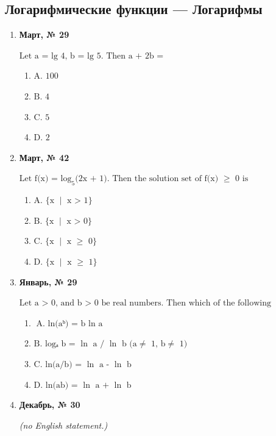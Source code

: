 \subsection*{Логарифмические функции — Логарифмы}
\begin{enumerate}
\item \textbf{Март, № 29} \par \smallskip
$\displaystyle \text{Let a = lg 4, b = lg 5. Then a + 2b =}$
\begin{enumerate}
\item $\displaystyle \text{A. 100}$
\item $\displaystyle \text{B. 4}$
\item $\displaystyle \text{C. 5}$
\item $\displaystyle \text{D. 2}$
\end{enumerate}
\item \textbf{Март, № 42} \par \smallskip
$\displaystyle \text{Let f(x) = log}_{5}\text{(2x + 1). Then the solution set of f(x) }\geq\text{  0 is}$
\begin{enumerate}
\item $\displaystyle \text{A. }\{\text{x }\mid\text{ x > 1}\}$
\item $\displaystyle \text{B. }\{\text{x }\mid\text{ x > 0}\}$
\item $\displaystyle \text{C. }\{\text{x }\mid\text{ x }\geq\text{  0}\}$
\item $\displaystyle \text{D. }\{\text{x }\mid\text{ x }\geq\text{  1}\}$
\end{enumerate}
\item \textbf{Январь, № 29} \par \smallskip
$\displaystyle \text{Let a > 0, and b > 0 be real numbers. Then which of the following statements is incorrect? ( )}$
\begin{enumerate}
\item $\displaystyle \text{A. ln(aᵇ) = b }\ln\text{ a}$
\item $\displaystyle \text{B. logₐ b = }\ln\text{ a / }\ln\text{ b (a}\neq\text{ 1, b}\neq\text{ 1)}$
\item $\displaystyle \text{C. ln(a/b) = }\ln\text{ a - }\ln\text{ b}$
\item $\displaystyle \text{D. ln(ab) = }\ln\text{ a + }\ln\text{ b}$
\end{enumerate}
\item \textbf{Декабрь, № 30} \par \smallskip
\textit{(no English statement.)}

\end{enumerate}
